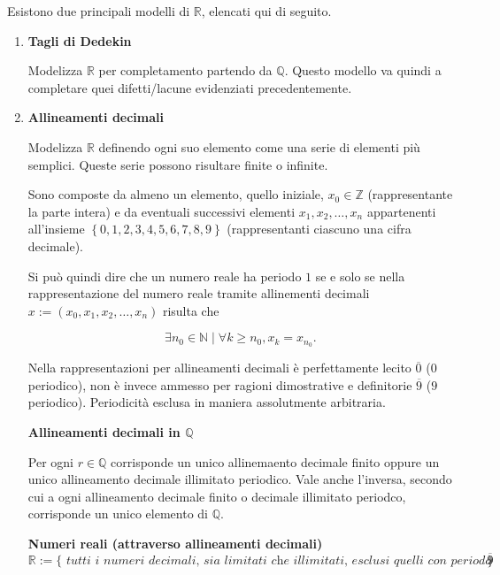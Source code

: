 Esistono due principali modelli di $\mathbb{R}$, elencati qui di seguito.

\begin{enumerate}
    \item \textbf{Tagli di Dedekin}
    
    Modelizza $\mathbb{R}$ per completamento partendo da $\mathbb{Q}$. Questo modello va quindi a completare
    quei difetti/lacune evidenziati precedentemente.

    \item \textbf{Allineamenti decimali}
    
    Modelizza $\mathbb{R}$ definendo ogni suo elemento come una serie di elementi più semplici. Queste serie
    possono risultare finite o infinite.
    
    Sono composte da almeno un elemento, quello iniziale, $x_0 \in
    \mathbb{Z}$ (rappresentante la parte intera) e da eventuali successivi elementi $x_1, x_2, \ldots, x_n$ appartenenti all'insieme
    $\left\{0, 1, 2, 3, 4, 5, 6, 7, 8, 9\right\}$ (rappresentanti ciascuno una cifra decimale).

    \begin{proposition}
        Si può quindi dire che un numero reale ha periodo $1$ se e solo se nella rappresentazione del numero reale tramite
        allinementi decimali $x := (x_0, x_1, x_2, \ldots , x_n)$ risulta che

        \[
            \exists n_0\in\mathbb{N}\mid\forall k\geq n_0, x_k=x_{n_0}.
        \]
    \end{proposition}

    \begin{observation}
        Nella rappresentazioni per allineamenti decimali è perfettamente lecito $\overline{0}$ ($0$ periodico),
        non è invece ammesso per ragioni dimostrative e definitorie $\overline{9}$ ($9$ periodico).
        Periodicità esclusa in maniera assolutmente arbitraria.
    \end{observation}

    \begin{theorem}
        \textbf{Allineamenti decimali in $\mathbb{Q}$}

        Per ogni $r\in\mathbb{Q}$ corrisponde un unico allinemaento decimale finito oppure un unico allineamento
        decimale illimitato periodico. Vale anche l'inversa, secondo cui a ogni allineamento decimale finito o
        decimale illimitato periodco, corrisponde un unico elemento di $\mathbb{Q}$.
    \end{theorem}

    \begin{definition}
        \textbf{Numeri reali (attraverso allineamenti decimali)}
        \[ \mathbb{R} := \{\textit{ tutti i numeri decimali, sia limitati che illimitati, esclusi quelli
        con periodo  $\overline{9}$}\} \]
    \end{definition}

\end{enumerate}